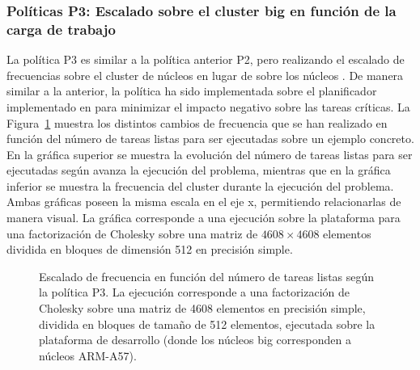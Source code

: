 \subsubsection{Políticas P3: Escalado sobre el cluster big en
  función de la carga de trabajo}

La política P3 es similar a la política anterior P2, pero realizando el
escalado de frecuencias sobre el cluster de núcleos \BIG en lugar de sobre los núcleos
\LITTLE. De manera similar a la anterior, la política ha sido implementada
sobre el planificador \botlev implementado en \ompss para 
minimizar el impacto negativo sobre las tareas críticas. La
Figura~\ref{s5:fig:P3-evo} muestra los distintos cambios de frecuencia que
se han realizado en función del número de tareas listas para ser
ejecutadas sobre un ejemplo concreto. En la gráfica superior se muestra la evolución del número de
tareas listas para ser ejecutadas según avanza la ejecución del problema,
mientras que en la gráfica inferior se muestra la frecuencia del cluster
\BIG durante la ejecución del problema. Ambas gráficas poseen la misma
escala en el eje x, permitiendo relacionarlas de manera visual. La gráfica
corresponde a una ejecución sobre la plataforma \juno para una factorización
de Cholesky sobre una matriz de $4608 \times 4608$ elementos dividida en bloques
de dimensión 512 en precisión simple.


\begin{figure}
  \centering
  {
    \setlength{\fboxsep}{-10pt}
  }
  \caption[Escalado de frecuencia en función del número de tareas listas
  según la política P3]{Escalado de frecuencia en función del número de
    tareas listas según la política P3. La ejecución corresponde a una
    factorización de Cholesky sobre una matriz de 4608 elementos en
    precisión simple, dividida en bloques de tamaño de 512 elementos,
    ejecutada sobre la plataforma de desarrollo \juno (donde los núcleos big
    corresponden a núcleos ARM-A57).}
  \label{s5:fig:P3-evo}
\end{figure}


